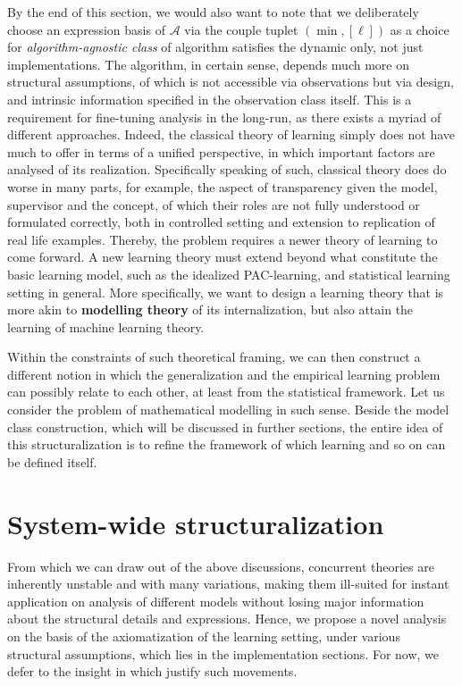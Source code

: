 By the end of this section, we would also want to note that we deliberately choose an expression basis of $\mathcal{A}$ via the couple tuplet $(\min, [\ell])$ as a choice for \textit{algorithm-agnostic class} of algorithm satisfies the dynamic only, not just implementations. The algorithm, in certain sense, depends much more on structural assumptions, of which is not accessible via observations but via design, and intrinsic information specified in the observation class itself. This is a requirement for fine-tuning analysis in the long-run, as there exists a myriad of different approaches. Indeed, the classical theory of learning simply does not have much to offer in terms of a unified perspective, in which important factors are analysed of its realization. Specifically speaking of such, classical theory does do worse in many parts, for example, the aspect of transparency given the model, supervisor and the concept, of which their roles are not fully understood or formulated correctly, both in controlled setting and extension to replication of real life examples. Thereby, the problem requires a newer theory of learning to come forward. A new learning theory must extend beyond what constitute the basic learning model, such as the idealized PAC-learning, and statistical learning setting in general. More specifically, we want to design a learning theory that is more akin to \textbf{modelling theory} of its internalization, but also attain the learning of machine learning theory. 

Within the constraints of such theoretical framing, we can then construct a different notion in which the generalization and the empirical learning problem can possibly relate to each other, at least from the statistical framework. Let us consider the problem of mathematical modelling in such sense. Beside the model class construction, which will be discussed in further sections, the entire idea of this structuralization is to refine the framework of which learning and so on can be defined itself. 

\section{System-wide structuralization}

From which we can draw out of the above discussions, concurrent theories are inherently unstable and with many variations, making them ill-suited for instant application on analysis of different models without losing major information about the structural details and expressions. Hence, we propose a novel analysis on the basis of the axiomatization of the learning setting, under various structural assumptions, which lies in the implementation sections. For now, we defer to the insight in which justify such movements. 

